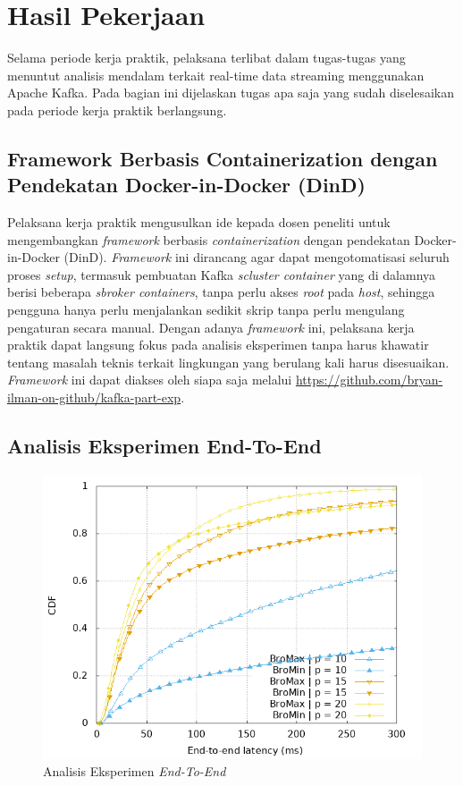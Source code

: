 \section{Hasil Pekerjaan}

Selama periode kerja praktik, pelaksana terlibat dalam tugas-tugas yang menuntut analisis mendalam terkait {real-time data streaming} menggunakan Apache Kafka. Pada bagian ini dijelaskan tugas apa saja yang sudah diselesaikan pada periode kerja praktik berlangsung.

\subsection{Framework Berbasis Containerization dengan Pendekatan Docker-in-Docker (DinD)}

Pelaksana kerja praktik mengusulkan ide kepada dosen peneliti untuk mengembangkan \textit{framework} berbasis \textit{containerization} dengan pendekatan Docker-in-Docker (DinD). \textit{Framework} ini dirancang agar dapat mengotomatisasi seluruh proses \textit{setup}, termasuk pembuatan Kafka \textit{scluster container} yang di dalamnya berisi beberapa \textit{sbroker containers}, tanpa perlu akses \textit{root} pada \textit{host}, sehingga pengguna hanya perlu menjalankan sedikit skrip tanpa perlu mengulang pengaturan secara manual. Dengan adanya \textit{framework} ini, pelaksana kerja praktik dapat langsung fokus pada analisis eksperimen tanpa harus khawatir tentang masalah teknis terkait lingkungan yang berulang kali harus disesuaikan. \textit{Framework} ini dapat diakses oleh siapa saja melalui \textcolor{blue}{\href{https://github.com/bryan-ilman-on-github/kafka-part-exp}{https://github.com/bryan-ilman-on-github/kafka-part-exp}}.

\subsection{Analisis Eksperimen End-To-End}

\begin{figure}
	\centering
	\includegraphics[width=1\textwidth]
	{assets/pics/latency-cdf.png}
	\caption{Analisis Eksperimen \textit{End-To-End}}
	\label{fig:latency-cdf}
\end{figure}

